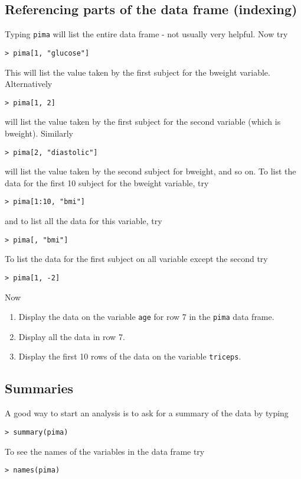 \documentclass[12pt]{article}
\begin{document}
\subsection{Referencing parts of the data frame (indexing)}

Typing \texttt{pima} will list the entire data frame - not usually very helpful. Now try
\begin{verbatim}
> pima[1, "glucose"]
\end{verbatim}
This will list the value taken by the first subject for the bweight variable. Alternatively
\begin{verbatim}
> pima[1, 2]
\end{verbatim}
will list the value taken by the first subject for the second variable (which is bweight). Similarly
\begin{verbatim}
> pima[2, "diastolic"]
\end{verbatim}
will list the value taken by the second subject for bweight, and so on. To list the data for the
first 10 subject for the bweight variable, try
\begin{verbatim}
> pima[1:10, "bmi"]
\end{verbatim}
and to list all the data for this variable, try
\begin{verbatim}
> pima[, "bmi"]
\end{verbatim}
To list the data for the first subject on all variable except the second try
\begin{verbatim}
> pima[1, -2]
\end{verbatim}

Now
\begin{enumerate}
\item Display the data on the variable \texttt{age} for row 7 in the \texttt{pima} data frame.
\item Display all the data in row 7.
\item Display the first 10 rows of the data on the variable \texttt{triceps}.
\end{enumerate}

\subsection{Summaries}

A good way to start an analysis is to ask for a summary of the data by typing
\begin{verbatim}
> summary(pima)
\end{verbatim}
To see the names of the variables in the data frame try
\begin{verbatim}
> names(pima)
\end{verbatim}
\end{document}
